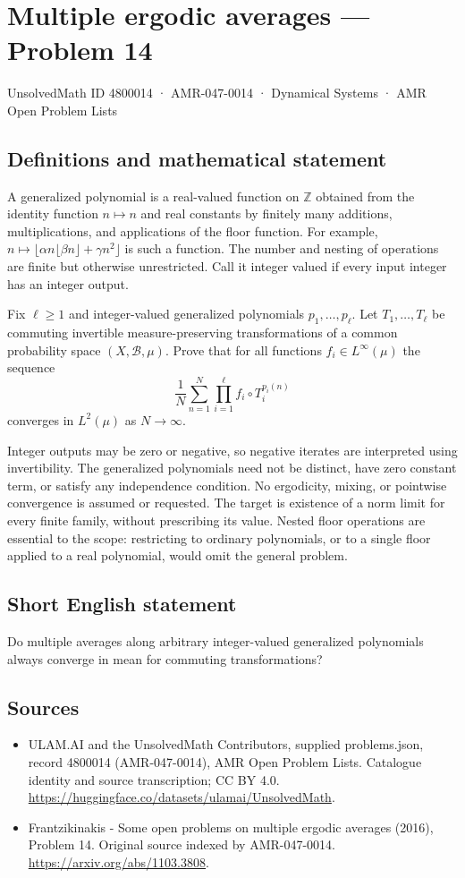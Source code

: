 \documentclass[11pt,a4paper]{article}
\begin{document}
\section*{Multiple ergodic averages — Problem 14}\label{4800014}
{\small UnsolvedMath ID 4800014 · AMR-047-0014 · Dynamical Systems · AMR Open Problem Lists}
\subsection{Definitions and mathematical statement}
A generalized polynomial is a real-valued function on
$\mathbb Z$ obtained from the identity function $n\mapsto n$
and real constants by finitely many additions,
multiplications, and applications of the floor function.
For example, $n\mapsto\lfloor\alpha n\lfloor\beta n\rfloor
+\gamma n^2\rfloor$ is such a function. The number and
nesting of operations are finite but otherwise unrestricted.
Call it integer valued if every input integer has an
integer output.

Fix $\ell\ge1$ and integer-valued generalized polynomials
$p_1,\ldots,p_\ell$. Let $T_1,\ldots,T_\ell$ be commuting
invertible measure-preserving transformations of a common
probability space $(X,\mathcal B,\mu)$. Prove that for
all functions $f_i\in L^\infty(\mu)$ the sequence
\[
          \frac1N\sum_{n=1}^N
               \prod_{i=1}^\ell f_i\circ T_i^{p_i(n)}
\]
converges in $L^2(\mu)$ as $N\to\infty$.

Integer outputs may be zero or negative, so negative
iterates are interpreted using invertibility. The
generalized polynomials need not be distinct, have
zero constant term, or satisfy any independence
condition. No ergodicity, mixing, or pointwise
convergence is assumed or requested. The target is
existence of a norm limit for every finite family,
without prescribing its value. Nested floor operations
are essential to the scope: restricting to ordinary
polynomials, or to a single floor applied to a real
polynomial, would omit the general problem.
\subsection{Short English statement}
Do multiple averages along arbitrary integer-valued generalized polynomials always converge in mean for commuting transformations?
\subsection{Sources}
\begin{itemize}
\item[S1] ULAM.AI and the UnsolvedMath Contributors, supplied problems.json, record 4800014 (AMR-047-0014), AMR Open Problem Lists. Catalogue identity and source transcription; CC BY 4.0.
\url{https://huggingface.co/datasets/ulamai/UnsolvedMath}.
\item[S2] Frantzikinakis - Some open problems on multiple ergodic averages (2016), Problem 14. Original source indexed by AMR-047-0014.
\url{https://arxiv.org/abs/1103.3808}.
\end{itemize}
\end{document}
